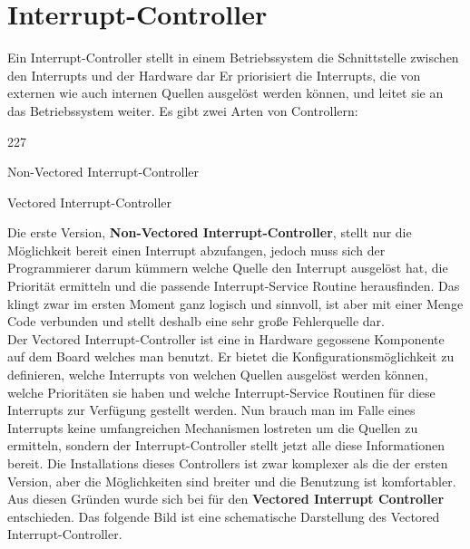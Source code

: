 \section{Interrupt-Controller}
Ein Interrupt-Controller stellt in einem Betriebssystem die Schnittstelle zwischen den Interrupts und der Hardware dar Er priorisiert die Interrupts, die von externen wie auch internen Quellen ausgel\"ost werden k\"onnen, und leitet sie an das Betriebssystem weiter. Es gibt zwei Arten von Controllern:
\begin{dinglist}{227}
	\item{Non-Vectored Interrupt-Controller}
	\item{Vectored Interrupt-Controller}
\end{dinglist}
Die erste Version, \textbf{Non-Vectored Interrupt-Controller}, stellt nur die M\"oglichkeit bereit einen Interrupt abzufangen, jedoch muss sich der Programmierer darum k\"ummern welche Quelle den Interrupt ausgel\"ost hat, die Priorit\"at ermitteln und die passende Interrupt-Service Routine herausfinden. Das klingt zwar im ersten Moment ganz logisch und sinnvoll, ist aber mit einer Menge Code verbunden und stellt deshalb eine sehr gro\ss e Fehlerquelle dar.\\
Der Vectored Interrupt-Controller ist eine in Hardware gegossene Komponente auf dem Board welches man benutzt. Er bietet die Konfigurationsm\"oglichkeit zu definieren, welche Interrupts von welchen Quellen ausgel\"ost werden k\"onnen, welche Priorit\"aten sie haben und welche Interrupt-Service Routinen f\"ur diese Interrupts zur Verf\"ugung gestellt werden. Nun brauch man im Falle eines Interrupts keine umfangreichen Mechanismen lostreten um die Quellen zu ermitteln, sondern der Interrupt-Controller stellt jetzt alle diese Informationen bereit. Die Installations dieses Controllers ist zwar komplexer als die der ersten Version, aber die M\"oglichkeiten sind breiter und die Benutzung ist komfortabler. Aus diesen Gr\"unden wurde sich bei \mops f\"ur den \textbf{Vectored Interrupt Controller} entschieden.
Das folgende Bild ist eine schematische Darstellung des Vectored Interrupt-Controller.

